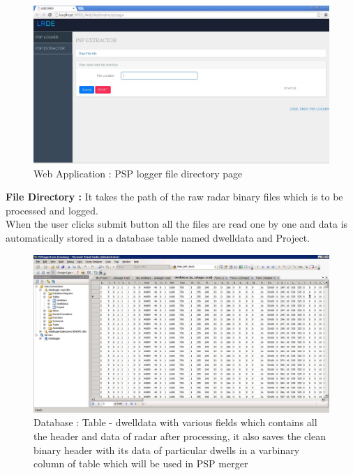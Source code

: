 \documentclass[12pt]{article} %
\begin{document}
   \begin{figure}[H]
   \includegraphics[width=\linewidth]{DirectoryPage.jpg}
  \caption{Web Application : PSP logger file directory page}
  \label{fig:figure 23}
\end{figure}  
\indent \textbf{File Directory :} It takes the path of the raw radar binary files which is to \indent be processed and logged.\\
When the user clicks submit button all the files are read one by one and data is automatically stored in a database table named dwelldata and Project.
 \begin{figure}[H]
\includegraphics[width=\linewidth]{database_table_data2.jpg}
  \caption[Database : Table - dwelldata]{Database : Table - dwelldata with various fields which contains all the header and data of radar after processing, it also saves the clean binary header with its data of particular dwells in a varbinary column of table which will be used in PSP merger }
  \label{fig:figure 24}
\end{figure}  
\end{document}
